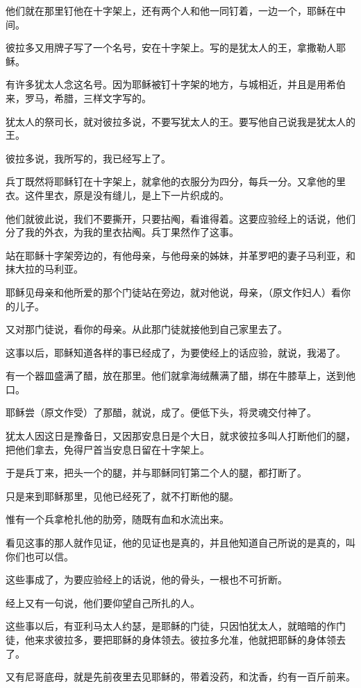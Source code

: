 \documentclass[12pt,oneside]{book}
\begin{document}
他们就在那里钉他在十字架上，还有两个人和他一同钉着，一边一个，耶稣在中间。

彼拉多又用牌子写了一个名号，安在十字架上。写的是犹太人的王，拿撒勒人耶稣。

有许多犹太人念这名号。因为耶稣被钉十字架的地方，与城相近，并且是用希伯来，罗马，希腊，三样文字写的。

犹太人的祭司长，就对彼拉多说，不要写犹太人的王。要写他自己说我是犹太人的王。

彼拉多说，我所写的，我已经写上了。

兵丁既然将耶稣钉在十字架上，就拿他的衣服分为四分，每兵一分。又拿他的里衣。这件里衣，原是没有缝儿，是上下一片织成的。

他们就彼此说，我们不要撕开，只要拈阄，看谁得着。这要应验经上的话说，他们分了我的外衣，为我的里衣拈阄。兵丁果然作了这事。

站在耶稣十字架旁边的，有他母亲，与他母亲的姊妹，并革罗吧的妻子马利亚，和抹大拉的马利亚。

耶稣见母亲和他所爱的那个门徒站在旁边，就对他说，母亲，（原文作妇人）看你的儿子。

又对那门徒说，看你的母亲。从此那门徒就接他到自己家里去了。

这事以后，耶稣知道各样的事已经成了，为要使经上的话应验，就说，我渴了。

有一个器皿盛满了醋，放在那里。他们就拿海绒蘸满了醋，绑在牛膝草上，送到他口。

耶稣尝（原文作受）了那醋，就说，成了。便低下头，将灵魂交付神了。

犹太人因这日是豫备日，又因那安息日是个大日，就求彼拉多叫人打断他们的腿，把他们拿去，免得尸首当安息日留在十字架上。

于是兵丁来，把头一个的腿，并与耶稣同钉第二个人的腿，都打断了。

只是来到耶稣那里，见他已经死了，就不打断他的腿。

惟有一个兵拿枪扎他的肋旁，随既有血和水流出来。

看见这事的那人就作见证，他的见证也是真的，并且他知道自己所说的是真的，叫你们也可以信。

这些事成了，为要应验经上的话说，他的骨头，一根也不可折断。

经上又有一句说，他们要仰望自己所扎的人。

这些事以后，有亚利马太人约瑟，是耶稣的门徒，只因怕犹太人，就暗暗的作门徒，他来求彼拉多，要把耶稣的身体领去。彼拉多允准，他就把耶稣的身体领去了。

又有尼哥底母，就是先前夜里去见耶稣的，带着没药，和沈香，约有一百斤前来。
\end{document}
